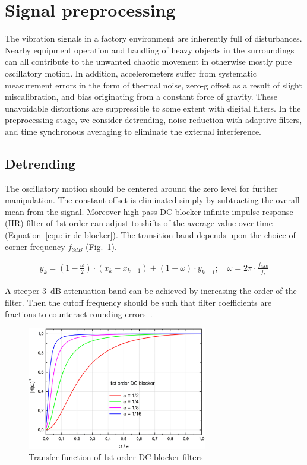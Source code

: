 \section{Signal preprocessing} \label{section:signal-preprocessing}
The vibration signals in a factory environment are inherently full of disturbances. Nearby equipment operation and handling of heavy objects in the surroundings can all contribute to the unwanted chaotic movement in otherwise mostly pure oscillatory motion. In addition, accelerometers suffer from systematic measurement errors in the form of thermal noise, zero-g offset as a result of slight miscalibration, and bias originating from a constant force of gravity. These unavoidable distortions are suppressible to some extent with digital filters. In the preprocessing stage, we consider detrending, noise reduction with adaptive filters, and time synchronous averaging to eliminate the external interference.

\subsection{Detrending}
The oscillatory motion should be centered around the zero level for further manipulation. The constant offset is eliminated simply by subtracting the overall mean from the signal. Moreover high pass DC blocker infinite impulse response (IIR) filter of 1st order can adjust to shifts of the average value over time (Equation~\ref{equ:iir-dc-blocker}). The transition band depends upon the choice of corner frequency $f_{3dB}$ (Fig.~\ref{fig:dc-blocker}).

\begin{ceqn}\begin{align} \label{equ:iir-dc-blocker}
y_k = (1 - \frac{\omega}{2}) \cdot (x_k  -  x_{k - 1}) + (1 - \omega) \cdot y_{k - 1}; \quad \omega = 2\pi \cdot \frac{f_{3dB}}{f_s}
\end{align}\end{ceqn}

A steeper 3~dB attenuation band can be achieved by increasing the order of the filter. Then the cutoff frequency should be such that filter coefficients are fractions to counteract rounding errors~\cite{tittelbach-helmrich_digital_2021}.

\begin{figure}[h]
	\centering
	\includegraphics[width=0.7\textwidth]{assets/iir-1-dc-blocker-band.jpg}
	\caption{Transfer function of 1st order DC blocker filters ~\cite{tittelbach-helmrich_digital_2021}}
	\label{fig:dc-blocker}
\end{figure}

